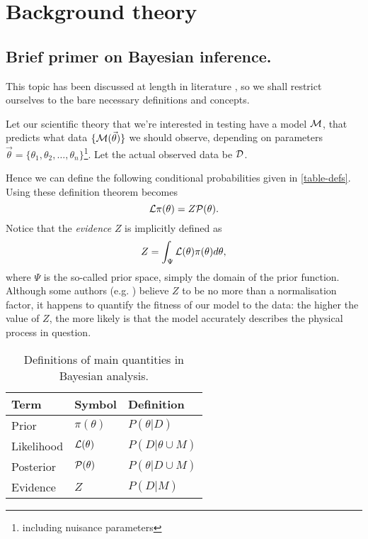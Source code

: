 \documentclass[usenatbib]{mnras}
\begin{document}
\section{Background theory}
\label{sec:org343d50c}

\subsection{Brief primer on Bayesian inference.}
\label{sec:orgee5a507}

This topic has been discussed at length in literature \citep{jeffreys2010scientific}, so we shall restrict ourselves to the bare necessary definitions and concepts. 

Let our scientific theory that we're interested in testing have a model \({\cal M}\), that predicts what data \(\lbrace {\cal M}(\vec{\theta})\rbrace\) we should observe, depending on parameters \(\vec{\theta} = \lbrace  \theta_1, \theta_2, \ldots, \theta_n \rbrace\)\footnote{including nuisance parameters}. Let the actual observed data be \({\cal D}\). 

   Hence we can define the following conditional probabilities given
in \autoref{table-defs}. Using these definition \citeauthor{1763} theorem
becomes 
\begin{equation}
{\cal L} \pi (\theta) = Z {\cal P} (\theta).
\label{eq:bayes} 
\end{equation}
Notice that the \emph{evidence} \(Z\) is
implicitly defined as 
\begin{equation} 
Z = \int_{\Psi} {\cal L}(\theta) \pi(\theta) d\theta, \label{eq:def-z}
\end{equation}
where \(\Psi\) is the so-called prior space, simply the domain of the
prior function. Although some authors
(e.g. \citeauthor{jeffreys2010scientific}) believe \(Z\) to be no more
than a normalisation factor, it happens to quantify the fitness of our
model to the data: the higher the value of \(Z\), the more likely is
that the model accurately describes the physical process in question.

\begin{table}[htbp]
\caption{Definitions of main quantities in Bayesian analysis. \label{table-defs}}
\centering
\begin{tabular}{lll}
\textbf{\textbf{Term}} & \textbf{\textbf{Symbol}} & \textbf{\textbf{Definition}}\\
\hline
Prior & \(\pi(\theta)\) & \(P ( \theta  \vert D)\)\\
Likelihood & \({\cal L}(\theta)\) & \(P ( D \vert \theta \cup M)\)\\
Posterior & \({\cal P}(\theta)\) & \(P ( \theta \vert D \cup M)\)\\
Evidence & \(Z\) & \(P ( D \vert M)\)\\
\end{tabular}
\end{table}
\end{document}
